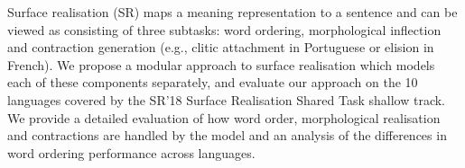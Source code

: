Surface realisation (SR) maps a meaning representation to a sentence
and can be viewed as consisting of three subtasks: word ordering,
morphological inflection and contraction generation (e.g., clitic
attachment in Portuguese or elision in French). We propose a modular
approach to surface realisation which models each of these components
separately, and evaluate our approach on the 10 languages covered by
the SR'18 Surface Realisation Shared Task shallow track. We provide a
detailed evaluation of how word order, morphological realisation and
contractions are handled by the model and an analysis of the
differences in word ordering performance across languages.